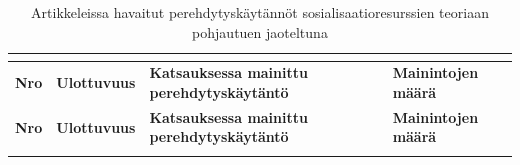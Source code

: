 \documentclass[utf8]{gradu3}
\begin{document}
\setlength{\LTcapwidth}{\textwidth}
 \begin{scriptsize}
        \begin{longtable}[c]{llll}
        \multicolumn{4}{c}{}\\
            \hline
                \textbf{Nro} & \textbf{Ulottuvuus} \parencite{saks-gruman-2012} & \textbf{Katsauksessa mainittu perehdytyskäytäntö} & \textbf{Mainintojen määrä} \\
            \hline
        \endfirsthead
        \hline
            \hline
                \textbf{Nro} & \textbf{Ulottuvuus} \parencite{saks-gruman-2012} & \textbf{Katsauksessa mainittu perehdytyskäytäntö} & \textbf{Mainintojen määrä} \\
            \hline
        \endhead
     \hline
     \endfoot
    \caption{Artikkeleissa havaitut perehdytyskäytännöt sosialisaatioresurssien teoriaan \parencite{saks-gruman-2012} pohjautuen jaoteltuna \label{tbl:longtable-srt-ulottuvuudet-ja-niiden-kaytannot}}
    \endlastfoot
    

\end{longtable}
\end{scriptsize}
\end{document}
